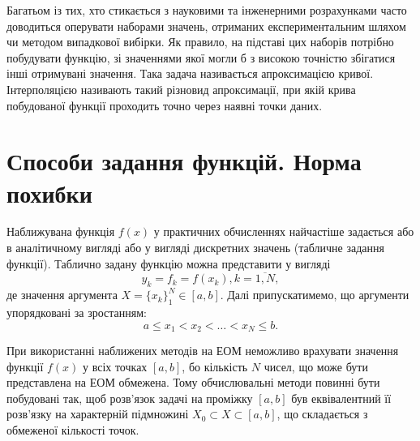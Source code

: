 \documentclass[ukrainian,14pt]{extarticle}
\begin{document}
Багатьом із тих, хто стикається з науковими та інженерними розрахунками часто доводиться оперувати наборами значень, отриманих експериментальним шляхом чи методом випадкової вибірки. Як правило, на підставі цих наборів потрібно побудувати функцію, зі значеннями якої могли б з високою точністю збігатися інші отримувані значення. Така задача називається апроксимацією кривої. Інтерполяцією називають такий різновид апроксимації, при якій крива побудованої функції проходить точно через наявні точки даних.

\newpage
\section{Способи задання функцій. Норма похибки}


%

Наближувана функція $f(x)$ у практичних обчисленнях найчастіше задається або в аналітичному вигляді або у вигляді дискретних значень (табличне задання функції). Таблично задану функцію можна представити у вигляді
$$y_k = f_k = f(x_k), k =\overline{1,N},$$
де значення аргумента $X=\{x_k\}_1^N \in [a, b]$. Далі припускатимемо, що аргументи упорядковані за зростанням:
$$a \leq x_1 < x_2 < \ldots < x_N \leq b.$$



При використанні наближених методів на ЕОМ неможливо врахувати значення функції $f(x)$ у всіх точках $[a,b]$, бо кількість $N$ 
чисел, що може бути представлена на ЕОМ обмежена. Тому обчислювальні методи повинні бути побудовані так, щоб розв'язок
задачі на проміжку $[a,b]$ був еквівалентний її розв'язку на характерній підмножині $X_0 \subset X \subset [a,b]$, що складається з обмеженої кількості точок.
\end{document}
